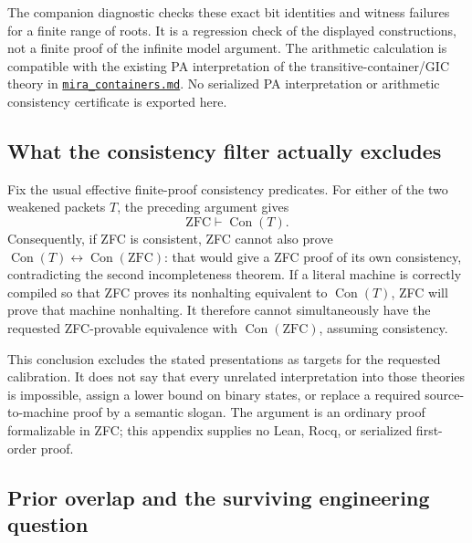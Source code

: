 The companion diagnostic checks these exact bit identities and witness
failures for a finite range of roots.  It is a regression check of the
displayed constructions, not a finite proof of the infinite model
argument.  The arithmetic calculation is compatible with the existing
PA interpretation of the transitive-container/GIC theory in
\href{https://github.com/VladimirReshetnikov/ProveIt/blob/13ec39ed43148b1807f51ed6e6528e1c84659562/Computability/BusyBeaver/Research/ZFC/mira_containers.md}{\texttt{mira\_containers.md}}.
No serialized PA interpretation or arithmetic consistency certificate is
exported here.

\subsection{What the consistency filter actually excludes}

Fix the usual effective finite-proof consistency predicates.  For either
of the two weakened packets $T$, the preceding argument gives
\[
 \mathrm{ZFC}\vdash\operatorname{Con}(T).
\]
Consequently, if ZFC is consistent, ZFC cannot also prove
$\operatorname{Con}(T)\leftrightarrow\operatorname{Con}(\mathrm{ZFC})$:
that would give a ZFC proof of its own consistency, contradicting the
second incompleteness theorem.  If a literal machine is correctly
compiled so that ZFC proves its nonhalting equivalent to
$\operatorname{Con}(T)$, ZFC will prove that machine nonhalting.  It
therefore cannot simultaneously have the requested ZFC-provable
equivalence with $\operatorname{Con}(\mathrm{ZFC})$, assuming consistency.

This conclusion excludes the stated presentations as targets for the
requested calibration.  It does not say that every unrelated
interpretation into those theories is impossible, assign a lower bound
on binary states, or replace a required source-to-machine proof by a
semantic slogan.  The argument is an ordinary proof formalizable in
ZFC; this appendix supplies no Lean, Rocq, or serialized first-order proof.

\subsection{Prior overlap and the surviving engineering question}

